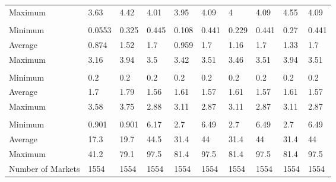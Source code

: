 \begin{tabular}[t]{llllllllll}
\hspace{1em}Maximum & 3.63 & 4.42 & 4.01 & 3.95 & 4.09 & 4 & 4.09 & 4.55 & 4.09\\
\addlinespace[0.3em]
\multicolumn{10}{l}{\textbf{Marginal Cost}}\\
\hspace{1em}Minimum & 0.0553 & 0.325 & 0.445 & 0.108 & 0.441 & 0.229 & 0.441 & 0.27 & 0.441\\
\hspace{1em}Average & 0.874 & 1.52 & 1.7 & 0.959 & 1.7 & 1.16 & 1.7 & 1.33 & 1.7\\
\hspace{1em}Maximum & 3.16 & 3.94 & 3.5 & 3.42 & 3.51 & 3.46 & 3.51 & 3.94 & 3.51\\
\addlinespace[0.3em]
\multicolumn{10}{l}{\textbf{Miles Flown}}\\
\hspace{1em}Minimum & 0.2 & 0.2 & 0.2 & 0.2 & 0.2 & 0.2 & 0.2 & 0.2 & 0.2\\
\hspace{1em}Average & 1.7 & 1.79 & 1.56 & 1.61 & 1.57 & 1.61 & 1.57 & 1.61 & 1.57\\
\hspace{1em}Maximum & 3.58 & 3.75 & 2.88 & 3.11 & 2.87 & 3.11 & 2.87 & 3.11 & 2.87\\
\addlinespace[0.3em]
\multicolumn{10}{l}{\textbf{Origin Service Ratio}}\\
\hspace{1em}Minimum & 0.901 & 0.901 & 6.17 & 2.7 & 6.49 & 2.7 & 6.49 & 2.7 & 6.49\\
\hspace{1em}Average & 17.3 & 19.7 & 44.5 & 31.4 & 44 & 31.4 & 44 & 31.4 & 44\\
\hspace{1em}Maximum & 41.2 & 79.1 & 97.5 & 81.4 & 97.5 & 81.4 & 97.5 & 81.4 & 97.5\\
\midrule
Number of Markets & 1554 & 1554 & 1554 & 1554 & 1554 & 1554 & 1554 & 1554 & 1554\\
\bottomrule
\end{tabular}
